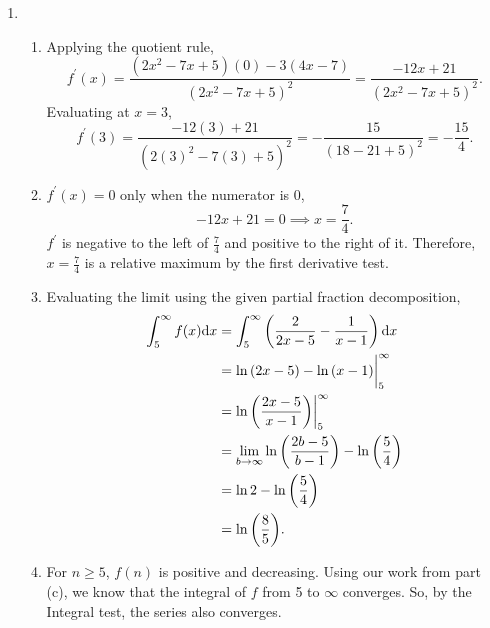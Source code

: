 \begin{enumerate}
	\item \begin{enumerate}
		\item Applying the quotient rule,
			\begin{equation*}
				f^\prime(x) = \frac{(2x^2-7x+5)(0)-3(4x-7)}{(2x^2-7x+5)^2} = \frac{-12x+21}{(2x^2-7x+5)^2}.
			\end{equation*}
			Evaluating at $x=3$,
			\begin{equation*}
				f^\prime(3) = \frac{-12(3)+21}{(2(3)^2-7(3)+5)^2} = -\frac{15}{(18-21+5)^2} = -\frac{15}{4}.
			\end{equation*}
		\item $f^\prime(x)=0$ only when the numerator is 0,
			\begin{equation*}
				-12x + 21 = 0 \implies x = \frac{7}{4}.
			\end{equation*}
			$f^\prime$ is negative to the left of $\frac{7}{4}$ and positive to the right of it.
			Therefore, $x=\frac{7}{4}$ is a relative maximum by the first derivative test.
		\item Evaluating the limit using the given partial fraction decomposition,
			\begin{align*}
				\int_{5}^{\infty}{f(x)\mathrm{d} x} &= \int_{5}^{\infty}{\left(\frac{2}{2x-5}-\frac{1}{x-1}\right)\mathrm{d} x} \\
				&= \ln{(2x-5)} - \ln{(x-1)} \biggr\rvert_{5}^{\infty} \\
				&= \ln{\left(\frac{2x-5}{x-1}\right)} \biggr\rvert_{5}^{\infty} \\
				&= \lim_{b\to\infty}{\ln{\left(\frac{2b-5}{b-1}\right)}} - \ln{\left(\frac{5}{4}\right)} \\
				&= \ln{2} - \ln{\left(\frac{5}{4}\right)} \\
				&= \ln{\left(\frac{8}{5}\right)}.
			\end{align*}
		\item For $n \geq 5$, $f(n)$ is positive and decreasing.
			Using our work from part (c), we know that the integral of $f$ from 5 to $\infty$ converges.
			So, by the Integral test, the series also converges.
	\end{enumerate}


\end{enumerate}
